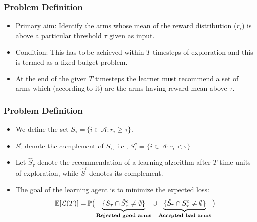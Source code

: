 \begin{frame}
\frametitle{Problem Definition}
\begin{itemize}
\item<1-> Primary aim: Identify the arms whose mean of the reward distribution ($r_i$) is above a particular threshold $\tau$ given as input.
\item<2-> Condition: This has to be achieved within $T$ timesteps of exploration and this is termed as a fixed-budget problem.
\item<3-> At the end of the given $T$ timesteps the learner must recommend a set of arms which (according to it) are the arms having reward mean above $\tau$.
\end{itemize}
\end{frame}

\begin{frame}
\frametitle{Problem Definition}
\begin{itemize}
\item<1-> We define the set $S_{\tau}=\lbrace i\in \mathcal{A}: r_{i}\geq \tau \rbrace$. 
\item<2-> $S_\tau^c$ denote the complement of $S_\tau$, i.e.,  $S_{\tau}^{c}=\lbrace i\in \mathcal{A}: r_{i} < \tau \rbrace$. 
\item<3-> Let $\hat{S}_{\tau}$ denote the recommendation of a learning algorithm after $T$ time units of exploration, while $\hat{S}_{\tau}^c$ denotes its complement.


\item<4-> The goal of the learning agent is to minimize the expected loss:
\begin{align*}
\mathbb{E}[\mathcal{L}(T)] &= \mathbb{P}\big(\underbrace{\lbrace S_{\tau}\cap \hat{S}_{\tau}^{c} \neq \emptyset \rbrace}_{\textbf{Rejected good arms}}  \cup   \underbrace{\lbrace \hat{S}_{\tau}\cap S_{\tau}^{c} \neq \emptyset\rbrace}_{\textbf{Accepted bad arms}}\big) \\
\end{align*}
\end{itemize}
\end{frame}


